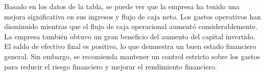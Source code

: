 

Basado en los datos de la tabla, se puede ver que la empresa ha tenido una mejora significativa en sus ingresos y flujo de caja neto. Los gastos operativos han disminuido mientras que el flujo de caja operacional aumentó considerablemente. La empresa también obtuvo un gran beneficio del aumento del capital invertido. El saldo de efectivo final es positivo, lo que demuestra un buen estado financiero general. Sin embargo, se recomienda mantener un control estricto sobre los gastos para reducir el riesgo financiero y mejorar el rendimiento financiero.